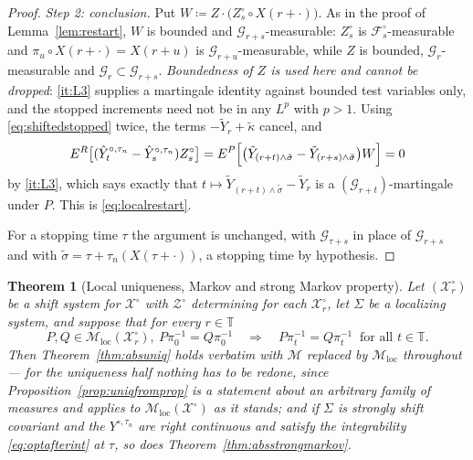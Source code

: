 \documentclass[11pt,a4paper]{article}
\theoremstyle{plain}
\newtheorem{theorem}{Theorem}[section]
\theoremstyle{definition}
\theoremstyle{remark}
\newcommand{\T}{\mathbb{T}}                     %
\newcommand{\Filt}{\mathcal{F}}
\newcommand{\Gilt}{\mathcal{G}}
\newcommand{\XX}{\mathcal{X}}                  %
\newcommand{\ZZ}{\mathcal{Z}}                  %
\newcommand{\Msol}{\mathcal{M}}
\begin{document}
\begin{proof}
  \emph{Step 2: conclusion.}
  Put $W \coloneqq Z \cdot \bigl( Z^\circ_s \circ X(r+\cdot) \bigr)$.  As in the
  proof of Lemma~\ref{lem:restart}, $W$ is bounded and $\Gilt_{r+s}$-measurable:
  $Z^\circ_s$ is $\Filt^\circ_s$-measurable and $\pi_u \circ X(r+\cdot) = X(r+u)$
  is $\Gilt_{r+u}$-measurable, while $Z$ is bounded, $\Gilt_r$-measurable and
  $\Gilt_r \subset \Gilt_{r+s}$.  \emph{Boundedness of $Z$ is used here and
  cannot be dropped}: \ref{it:L3} supplies a martingale identity against bounded
  test variables only, and the stopped increments need not be in any $L^p$ with
  $p > 1$.  Using \eqref{eq:shiftedstopped} twice, the terms
  $-\tilde{Y}_r + \tilde\kappa$ cancel, and
  \[
    E^R\bigl[ (\hat{Y}^{\circ,\tau_n}_t - \hat{Y}^{\circ,\tau_n}_s) Z^\circ_s \bigr]
      = E^P\Bigl[ \bigl( \tilde{Y}_{(r+t) \wedge \tilde\sigma}
          - \tilde{Y}_{(r+s) \wedge \tilde\sigma} \bigr) W \Bigr]
      = 0
  \]
  by \ref{it:L3}, which says exactly that
  $t \mapsto \tilde{Y}_{(r+t)\wedge\tilde\sigma} - \tilde{Y}_r$ is a
  $(\Gilt_{r+t})$-martingale under $P$.  This is \eqref{eq:localrestart}.

  For a stopping time $\tau$ the argument is unchanged, with $\Gilt_{\tau+s}$ in
  place of $\Gilt_{r+s}$ and with $\tilde\sigma = \tau + \tau_n(X(\tau+\cdot))$, a
  stopping time by hypothesis.
\end{proof}

\begin{theorem}[Local uniqueness, Markov and strong Markov property]
  \label{thm:localuniq}
  Let $(\XX^\circ_r)$ be a shift system for $\XX^\circ$ with $\ZZ^\circ$
  determining for each $\XX^\circ_r$, let $\Sigma$ be a localizing system, and
  suppose that for every $r \in \T$
  \begin{equation}
    \label{eq:localonedim}
    P, Q \in \Msol_{\mathrm{loc}}(\XX^\circ_r), \ P\pi_0^{-1} = Q\pi_0^{-1}
    \quad \Longrightarrow \quad
    P\pi_t^{-1} = Q\pi_t^{-1} \ \text{ for all } t \in \T .
  \end{equation}
  Then Theorem~\ref{thm:absuniq} holds verbatim with $\Msol$ replaced by
  $\Msol_{\mathrm{loc}}$ throughout --- for the uniqueness half nothing has to be
  redone, since Proposition~\ref{prop:uniqfromprop} is a statement about an
  arbitrary family of measures and applies to
  $\Msol_{\mathrm{loc}}(\XX^\circ)$ as it stands; and if $\Sigma$ is strongly shift covariant
  and the $Y^{\circ,\tau_n}$ are right continuous and satisfy the integrability
  \eqref{eq:optafterint} at $\tau$, so does
  Theorem~\ref{thm:absstrongmarkov}.
\end{theorem}
\end{document}
